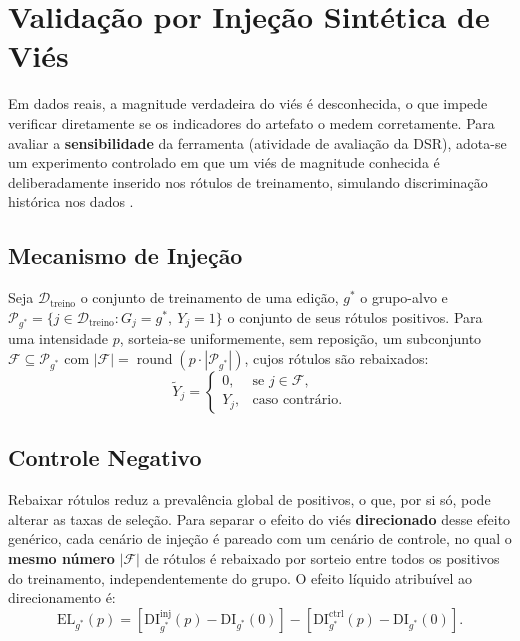 \section{Validação por Injeção Sintética de Viés}
\label{sec:injecao}

Em dados reais, a magnitude verdadeira do viés é desconhecida, o que impede verificar diretamente se os indicadores do artefato o medem corretamente. Para avaliar a \textbf{sensibilidade} da ferramenta (atividade de avaliação da DSR), adota-se um experimento controlado em que um viés de magnitude conhecida é deliberadamente inserido nos rótulos de treinamento, simulando discriminação histórica nos dados \cite{wick2019unlocking}.

\subsection{Mecanismo de Injeção}

Seja $\mathcal{D}_{\text{treino}}$ o conjunto de treinamento de uma edição, $g^{*}$ o grupo-alvo e $\mathcal{P}_{g^{*}} = \{ j \in \mathcal{D}_{\text{treino}} : G_j = g^{*},\ Y_j = 1 \}$ o conjunto de seus rótulos positivos. Para uma intensidade $p$, sorteia-se uniformemente, sem reposição, um subconjunto $\mathcal{F} \subseteq \mathcal{P}_{g^{*}}$ com $|\mathcal{F}| = \operatorname{round}(p \cdot |\mathcal{P}_{g^{*}}|)$, cujos rótulos são rebaixados:
\begin{equation}
\tilde{Y}_j = \begin{cases} 0, & \text{se } j \in \mathcal{F},\\ Y_j, & \text{caso contrário.} \end{cases}
\label{eq:injecao}
\end{equation}

\subsection{Controle Negativo}

Rebaixar rótulos reduz a prevalência global de positivos, o que, por si só, pode alterar as taxas de seleção. Para separar o efeito do viés \textbf{direcionado} desse efeito genérico, cada cenário de injeção é pareado com um cenário de controle, no qual o \textbf{mesmo número} $|\mathcal{F}|$ de rótulos é rebaixado por sorteio entre todos os positivos do treinamento, independentemente do grupo. O efeito líquido atribuível ao direcionamento é:
\begin{equation}
\mathrm{EL}_{g^{*}}(p) = \left[\mathrm{DI}^{\text{inj}}_{g^{*}}(p) - \mathrm{DI}_{g^{*}}(0)\right] - \left[\mathrm{DI}^{\text{ctrl}}_{g^{*}}(p) - \mathrm{DI}_{g^{*}}(0)\right].
\label{eq:efeito_liquido}
\end{equation}

